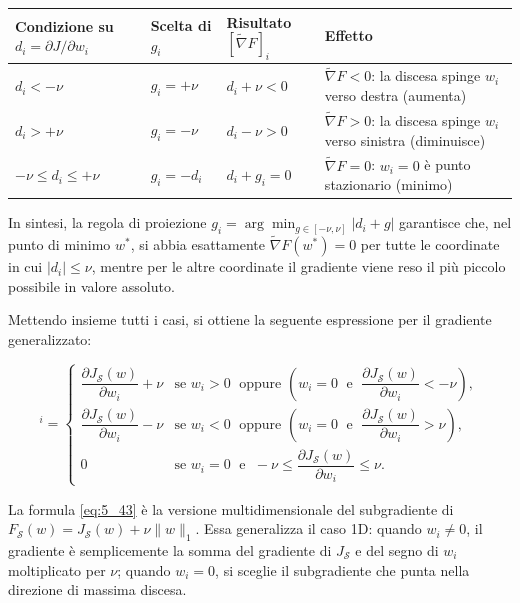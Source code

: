 \documentclass[a4paper,12pt]{article}
\numberwithin{equation}{section}
\numberwithin{figure}{section}
\numberwithin{table}{section}
\begin{document}
{\small
\setlength{\tabcolsep}{4pt}
\renewcommand{\arraystretch}{1.3}
\begin{center}
\begin{tabular}{>{\raggedright\arraybackslash}p{}
                >{\raggedright\arraybackslash}p{}
                >{\raggedright\arraybackslash}p{}
                >{\raggedright\arraybackslash}p{}}
\toprule
Condizione su $d_i = \partial J/\partial w_i$ &
Scelta di $g_i$ &
Risultato $[\widetilde{\nabla}F]_i$ &
Effetto \\
\midrule
$d_i < -\nu$ &
$g_i = +\nu$ &
$d_i + \nu < 0$ &
$\widetilde{\nabla}F < 0$: la discesa spinge $w_i$ verso destra (aumenta) \\
$d_i > +\nu$ &
$g_i = -\nu$ &
$d_i - \nu > 0$ &
$\widetilde{\nabla}F > 0$: la discesa spinge $w_i$ verso sinistra (diminuisce) \\
$-\nu \leq d_i \leq +\nu$ &
$g_i = -d_i$ &
$d_i + g_i = 0$ &
$\widetilde{\nabla}F = 0$: $w_i = 0$ è punto stazionario (minimo) \\
\bottomrule
\end{tabular}
\end{center}
}

In sintesi, la regola di proiezione \(g_i = \arg\min_{g \in [-\nu,\nu]} |d_i + g|\) garantisce che, nel punto di minimo \(w^*\), si abbia esattamente \(\widetilde{\nabla}F(w^*) = 0\) per tutte le coordinate in cui \(|d_i| \le \nu\), mentre per le altre coordinate il gradiente viene reso il più piccolo possibile in valore assoluto.

Mettendo insieme tutti i casi, si ottiene la seguente espressione per il
gradiente generalizzato:

\vspace*{-\baselineskip}
\begin{equation}
[\widetilde{\nabla} F_{\mathcal{S}}(w)]^i =
\begin{cases}
\dfrac{\partial J_{\mathcal{S}}(w)}{\partial w_i} + \nu
& \text{se } w_i > 0 \;\text{ oppure } \left( w_i = 0 \;\text{ e }\; \dfrac{\partial J_{\mathcal{S}}(w)}{\partial w_i} < -\nu \right), \\[12pt]
\dfrac{\partial J_{\mathcal{S}}(w)}{\partial w_i} - \nu
& \text{se } w_i < 0 \;\text{ oppure } \left( w_i = 0 \;\text{ e }\; \dfrac{\partial J_{\mathcal{S}}(w)}{\partial w_i} > \nu \right), \\[12pt]
0
& \text{se } w_i = 0 \;\text{ e }\; -\nu \leq \dfrac{\partial J_{\mathcal{S}}(w)}{\partial w_i} \leq \nu.
\end{cases}
\tag{5.43}\label{eq:5_43}
\end{equation}
\vspace*{-\baselineskip}
\begin{notebox}
  La formula \eqref{eq:5_43} è la versione multidimensionale del subgradiente di
  $F_{\mathcal{S}}(w) = J_{\mathcal{S}}(w) + \nu\|w\|_1$. Essa generalizza
  il caso 1D: quando $w_i \neq 0$, il gradiente è semplicemente la somma
  del gradiente di $J_{\mathcal{S}}$ e del segno di $w_i$ moltiplicato per $\nu$;
  quando $w_i = 0$, si sceglie il subgradiente che punta nella direzione di
  massima discesa.
\end{notebox}
\end{document}
